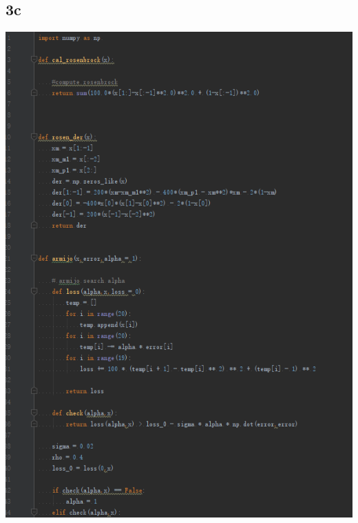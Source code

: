 \documentclass{article}
\begin{document}
\subsection{3c}
\includegraphics[scale=0.6]{1590807226(1).png}
\end{document}
